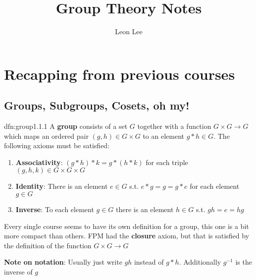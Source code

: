 \documentclass{article}
\title{Group Theory Notes}
\author{Leon Lee}
\begin{document}
\maketitle
\newpage
\tableofcontents
\newpage

\section{Recapping from previous courses}
\subsection{Groups, Subgroups, Cosets, oh my!}

\begin{dfn}[Group]{dfn:group}{1.1.1}
    A \textbf{group} consists of a set $G$ together with a function $G \times G \to G$ which maps an ordered pair $(g, h)\in G \times G$ to an element $g * h \in G$. The following axioms must be satisfied:
    \begin{enumerate}
        \item \textbf{Associativity}: $(g * h) * k = g * (h * k)$ for each triple $(g, h, k)\in G \times G \times G$
        \item \textbf{Identity}: There is an element $e \in G$ s.t. $e * g = g = g * e$ for each element $g\in G$
        \item \textbf{Inverse}: To each element $g\in G$ there is an element $h\in G$ s.t. $gh = e = hg$ 
    \end{enumerate}
\end{dfn}

Every single course seems to have its own definition for a group, this one is a bit more compact than others. FPM had the \textbf{closure} axiom, but that is satisfied by the definition of the function $G \times G \to G$

\textbf{Note on notation}: Usually just write $gh$ instead of $g * h$. Additionally $g^{-1}$ is the inverse of $g$
\end{document}
